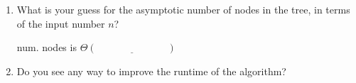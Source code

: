 \documentclass[11pt]{article}
\begin{document}
\begin{enumerate}
   \begin{center}
\end{center}

\newpage

\item What is your guess for the asymptotic number of nodes in the tree,
in terms of the input number $n$?

num. nodes is $\Theta(\underline{\hspace{3cm}})$

\item Do you see any way to improve the runtime of the algorithm?

\end{enumerate}




\end{document}
